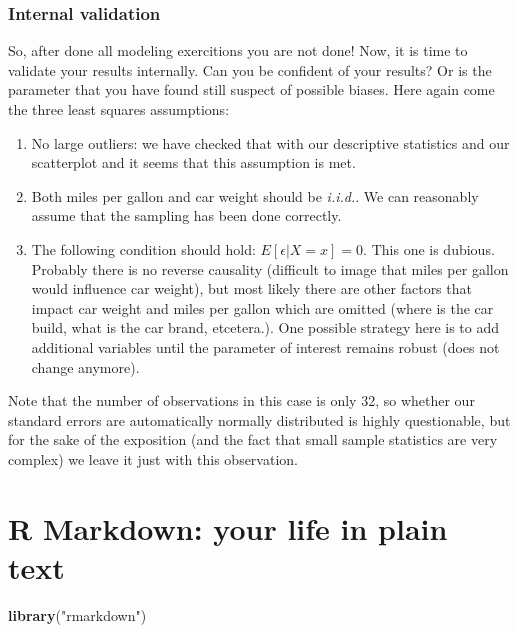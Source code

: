 \documentclass[]{article}
\newenvironment{Shaded}{\begin{snugshade}}{\end{snugshade}}
\newcommand{\KeywordTok}[1]{\textcolor[rgb]{0.13,0.29,0.53}{\textbf{#1}}}
\newcommand{\StringTok}[1]{\textcolor[rgb]{0.31,0.60,0.02}{#1}}
\newcommand{\NormalTok}[1]{#1}
\theoremstyle{definition}
\theoremstyle{definition}
\theoremstyle{definition}
\theoremstyle{remark}
\begin{document}
\subsubsection{Internal validation}\label{internal-validation}

So, after done all modeling exercitions you are not done! Now, it is
time to validate your results internally. Can you be confident of your
results? Or is the parameter that you have found still suspect of
possible biases. Here again come the three least squares assumptions:

\begin{enumerate}
\def\labelenumi{\arabic{enumi}.}
\item
  No large outliers: we have checked that with our descriptive
  statistics and our scatterplot and it seems that this assumption is
  met.
\item
  Both miles per gallon and car weight should be \emph{i.i.d.}. We can
  reasonably assume that the sampling has been done correctly.
\item
  The following condition should hold: \(E[\epsilon|X=x] = 0\). This one
  is dubious. Probably there is no reverse causality (difficult to image
  that miles per gallon would influence car weight), but most likely
  there are other factors that impact car weight and miles per gallon
  which are omitted (where is the car build, what is the car brand,
  etcetera.). One possible strategy here is to add additional variables
  until the parameter of interest remains robust (does not change
  anymore).
\end{enumerate}

Note that the number of observations in this case is only 32, so whether
our standard errors are automatically normally distributed is highly
questionable, but for the sake of the exposition (and the fact that
small sample statistics are very complex) we leave it just with this
observation.

\section{R Markdown: your life in plain
text}\label{r-markdown-your-life-in-plain-text}

\begin{Shaded}
\begin{Highlighting}[]
\KeywordTok{library}\NormalTok{(}\StringTok{"rmarkdown"}\NormalTok{)}
\end{Highlighting}
\end{Shaded}
\end{document}
